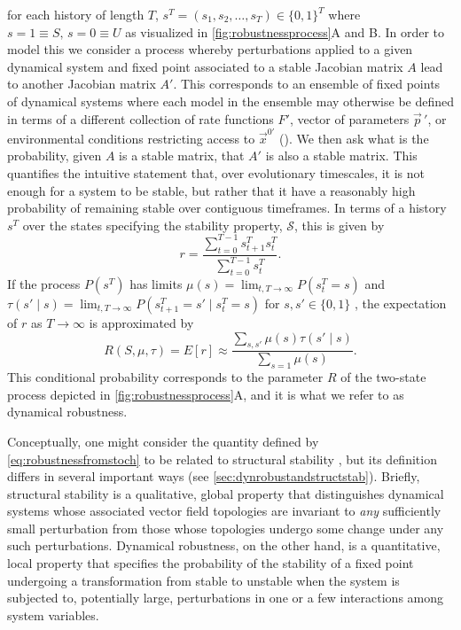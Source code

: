 for each history of length $T$, $s^T = ( s_1, s_2, \ldots, s_T ) \in \{0,1\}^T$ where $s=1 \equiv S,\, s=0 \equiv U$ as visualized in \ref{fig:robustnessprocess}A and B. In order to model this we consider a process whereby perturbations applied to a given dynamical system and fixed point associated to a stable Jacobian matrix $A$ lead to another Jacobian matrix $A'$.  This corresponds to an ensemble of fixed points of dynamical systems where each model in the ensemble may otherwise be defined in terms of a different collection of rate functions $F'$, vector of parameters ${\vec{p}}\,'$, or environmental conditions restricting access to $\vec{x}^{0'}$ (). We then ask what is the probability, given $A$ is a stable matrix, that $A'$ is also a stable matrix. This quantifies the intuitive statement that, over evolutionary timescales, it is not enough for a system to be stable, but rather that it have a reasonably high probability of remaining stable over contiguous timeframes. In terms of a history $s^T$ over the states specifying the stability property, $\mathcal{S}$, this is given by
$$
r = \frac{\sum_{t=0}^{T-1} s_{t+1}^T s_{t}^T}{\sum_{t=0}^{T-1} s_{t}^T}.
$$
If the process $P(s^T)$ has limits $\mu(s) = \lim_{t,T \rightarrow \infty} P(s_t^T=s)$ and $\tau(s' \mid s) = \lim_{t,T \rightarrow \infty} P(s_{t+1}^T = s' \mid s_t^T = s)$ for $s,s' \in \{0,1\}$
, the expectation of $r$ as $T \rightarrow \infty$ is approximated by
\begin{equation}\label{eq:robustnessfromstoch}
R(S,\mu,\tau) = E[r] \approx \frac{\sum_{s,s'} \mu(s) \tau(s' \mid s)}{\sum_{s=1} \mu(s)}.
\end{equation}
This conditional probability corresponds to the parameter $R$ of the two-state process depicted in \ref{fig:robustnessprocess}A, and it is what we refer to as dynamical robustness.

Conceptually, one might consider the quantity defined by \ref{eq:robustnessfromstoch} to be related to structural stability \cite{Smale1967}, but its definition differs in several important ways (see \ref{sec:dynrobustandstructstab}). Briefly, structural stability is a qualitative, global property that distinguishes dynamical systems whose associated vector field topologies are invariant to \emph{any} sufficiently small perturbation from those whose topologies undergo some change under any such perturbations. Dynamical robustness, on the other hand, is a quantitative, local property that specifies the probability of the stability of a fixed point undergoing a transformation from stable to unstable when the system is subjected to, potentially large, perturbations in one or a few interactions among system variables.


